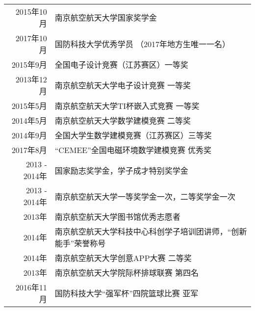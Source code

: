%
%




\begin{tabular}{rl}	
	2015年10月 & 南京航空航天大学国家奖学金 \\
	2017年10月 & 国防科技大学优秀学员 （2017年地方生唯一一名）\\
	2015年9月 & 全国电子设计竞赛（江苏赛区）一等奖 \\
	2013年12月 & 南京航空航天大学电子设计竞赛 一等奖\\
	2015年5月 & 南京航空航天大学TI杯嵌入式竞赛 一等奖\\
	2014年5月 & 南京航空航天大学数学建模竞赛 二等奖\\
	2014年9月 & 全国大学生数学建模竞赛（江苏赛区）三等奖\\
	2017年8月 & “CEMEE”全国电磁环境数学建模竞赛 优秀奖\\
	2013 - 2014年 & 国家励志奖学金，学子成才特别奖学金 \\
	2013 - 2014年 & 南京航空航天大学一等奖学金一次，二等奖学金一次\\
	2013年 & 南京航空航天大学图书馆优秀志愿者\\
	2014年 & 南京航空航天大学科技中心科创学子培训团讲师，“创新能手”荣誉称号\\
	2014年 & 南京航空航天大学创意APP大赛 二等奖\\
	2013年 & 南京航空航天大学院际杯排球联赛 第四名\\
	2016年11月 & 国防科技大学“强军杯”四院篮球比赛 亚军\\
\end{tabular}

